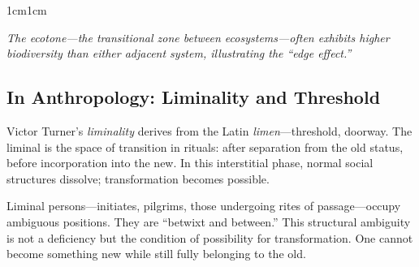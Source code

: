 \documentclass[../main.tex]{subfiles}
\begin{document}
\begin{adjustwidth}{1cm}{1cm}
\begin{center}
\small\textit{The ecotone---the transitional zone between ecosystems---often exhibits higher biodiversity than either adjacent system, illustrating the ``edge effect.''}\normalsize
\end{center}

\vspace{0.5cm}

\subsection*{In Anthropology: Liminality and Threshold}

Victor Turner's \textit{liminality} derives from the Latin \textit{limen}---threshold, doorway. The liminal is the space of transition in rituals: after separation from the old status, before incorporation into the new. In this interstitial phase, normal social structures dissolve; transformation becomes possible.

Liminal persons---initiates, pilgrims, those undergoing rites of passage---occupy ambiguous positions. They are ``betwixt and between.'' This structural ambiguity is not a deficiency but the condition of possibility for transformation. One cannot become something new while still fully belonging to the old.

\vspace{0.5cm}

\begin{center}
\end{center}
\end{adjustwidth}
\end{document}
